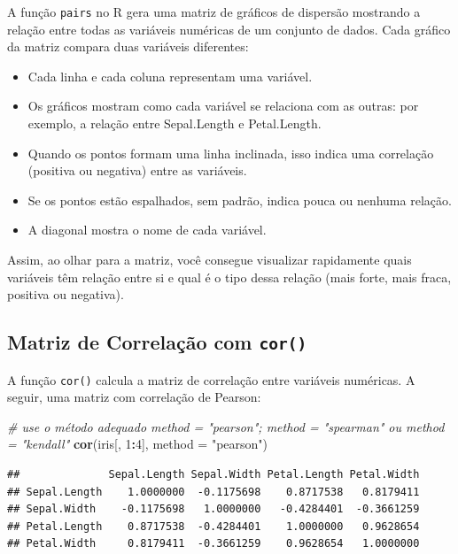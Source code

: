\documentclass[
]{book}
\newenvironment{Shaded}{\begin{snugshade}}{\end{snugshade}}
\newcommand{\AttributeTok}[1]{\textcolor[rgb]{0.13,0.29,0.53}{#1}}
\newcommand{\CommentTok}[1]{\textcolor[rgb]{0.56,0.35,0.01}{\textit{#1}}}
\newcommand{\DecValTok}[1]{\textcolor[rgb]{0.00,0.00,0.81}{#1}}
\newcommand{\FunctionTok}[1]{\textcolor[rgb]{0.13,0.29,0.53}{\textbf{#1}}}
\newcommand{\NormalTok}[1]{#1}
\newcommand{\SpecialCharTok}[1]{\textcolor[rgb]{0.81,0.36,0.00}{\textbf{#1}}}
\newcommand{\StringTok}[1]{\textcolor[rgb]{0.31,0.60,0.02}{#1}}
\providecommand{\tightlist}{%
  \setlength{\itemsep}{0pt}\setlength{\parskip}{0pt}}
\begin{document}
A função \texttt{pairs} no R gera uma matriz de gráficos de dispersão mostrando a relação entre todas as variáveis numéricas de um conjunto de dados. Cada gráfico da matriz compara duas variáveis diferentes:

\begin{itemize}
\tightlist
\item
  Cada linha e cada coluna representam uma variável.
\item
  Os gráficos mostram como cada variável se relaciona com as outras: por exemplo, a relação entre Sepal.Length e Petal.Length.
\item
  Quando os pontos formam uma linha inclinada, isso indica uma correlação (positiva ou negativa) entre as variáveis.
\item
  Se os pontos estão espalhados, sem padrão, indica pouca ou nenhuma relação.
\item
  A diagonal mostra o nome de cada variável.
\end{itemize}

Assim, ao olhar para a matriz, você consegue visualizar rapidamente quais variáveis têm relação entre si e qual é o tipo dessa relação (mais forte, mais fraca, positiva ou negativa).

\subsection{\texorpdfstring{Matriz de Correlação com \texttt{cor()}}{Matriz de Correlação com cor()}}\label{matriz-de-correlauxe7uxe3o-com-cor}

A função \texttt{cor()} calcula a matriz de correlação entre variáveis numéricas. A seguir, uma matriz com correlação de Pearson:

\begin{Shaded}
\begin{Highlighting}[]
\CommentTok{\# use o método adequado method = "pearson";  method = "spearman" ou method = "kendall"}
\FunctionTok{cor}\NormalTok{(iris[, }\DecValTok{1}\SpecialCharTok{:}\DecValTok{4}\NormalTok{], }\AttributeTok{method =} \StringTok{"pearson"}\NormalTok{)}
\end{Highlighting}
\end{Shaded}

\begin{verbatim}
##              Sepal.Length Sepal.Width Petal.Length Petal.Width
## Sepal.Length    1.0000000  -0.1175698    0.8717538   0.8179411
## Sepal.Width    -0.1175698   1.0000000   -0.4284401  -0.3661259
## Petal.Length    0.8717538  -0.4284401    1.0000000   0.9628654
## Petal.Width     0.8179411  -0.3661259    0.9628654   1.0000000
\end{verbatim}
\end{document}
